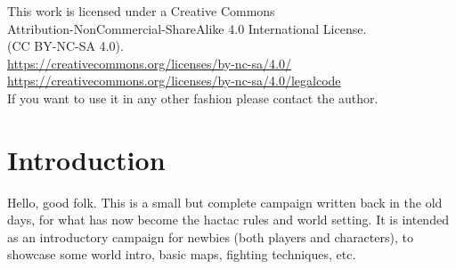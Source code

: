 
\raggedbottom


\thispagestyle{empty} %

\vsmall \noindent
This work is licensed under a Creative Commons \\
Attribution-NonCommercial-ShareAlike 4.0 International License. \\
(CC BY-NC-SA 4.0).\\
\url{https://creativecommons.org/licenses/by-nc-sa/4.0/} \\
\url{https://creativecommons.org/licenses/by-nc-sa/4.0/legalcode} \\
If you want to use it in any other fashion please contact the author.
\normalsize

\vfill


\clearpage              %
\flushbottom
\tableofcontents        %
\newpage                %



\setcounter{secnumdepth}{-1}





















\clearpage
\setcounter{page}{1}
\flushbottom
{}
\section*{Introduction}
Hello, good folk. This is a small but complete campaign written back in the old days, for what has now become the hactac rules and world setting. It is intended as an introductory campaign for newbies (both players and characters), to showcase some world intro, basic maps, fighting techniques, etc.

